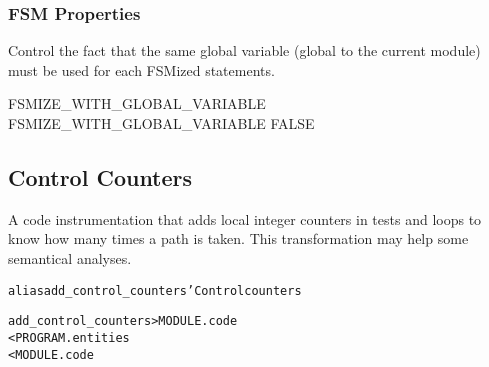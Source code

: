 \documentclass[a4paper]{report}
\newenvironment{PipsMake}{\begin{alltt}}{\end{alltt}}
\begin{document}
\subsubsection{FSM Properties}

Control the fact that the same global variable (global to the
current module) must be used for each FSMized statements.

\begin{PipsProp}{FSMIZE_WITH_GLOBAL_VARIABLE}
FSMIZE_WITH_GLOBAL_VARIABLE FALSE
\end{PipsProp}

\subsection{Control Counters}

A code instrumentation that adds local integer counters in tests and loops
to know how many times a path is taken. This transformation may
help some semantical analyses.

\begin{PipsMake}
alias add_control_counters 'Control counters

add_control_counters    > MODULE.code
        < PROGRAM.entities
        < MODULE.code
\end{PipsMake}







\end{document}
